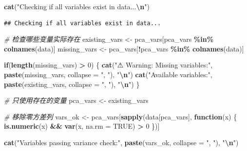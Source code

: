 \documentclass[
]{article}
\newenvironment{Shaded}{\begin{snugshade}}{\end{snugshade}}
\newcommand{\AttributeTok}[1]{\textcolor[rgb]{0.13,0.29,0.53}{#1}}
\newcommand{\CommentTok}[1]{\textcolor[rgb]{0.56,0.35,0.01}{\textit{#1}}}
\newcommand{\ConstantTok}[1]{\textcolor[rgb]{0.56,0.35,0.01}{#1}}
\newcommand{\ControlFlowTok}[1]{\textcolor[rgb]{0.13,0.29,0.53}{\textbf{#1}}}
\newcommand{\DecValTok}[1]{\textcolor[rgb]{0.00,0.00,0.81}{#1}}
\newcommand{\FunctionTok}[1]{\textcolor[rgb]{0.13,0.29,0.53}{\textbf{#1}}}
\newcommand{\NormalTok}[1]{#1}
\newcommand{\OtherTok}[1]{\textcolor[rgb]{0.56,0.35,0.01}{#1}}
\newcommand{\SpecialCharTok}[1]{\textcolor[rgb]{0.81,0.36,0.00}{\textbf{#1}}}
\newcommand{\StringTok}[1]{\textcolor[rgb]{0.31,0.60,0.02}{#1}}
\begin{document}
\begin{Shaded}
\begin{Highlighting}[]
\FunctionTok{cat}\NormalTok{(}\StringTok{"Checking if all variables exist in data...}\SpecialCharTok{\textbackslash{}n}\StringTok{"}\NormalTok{)}
\end{Highlighting}
\end{Shaded}

\begin{verbatim}
## Checking if all variables exist in data...
\end{verbatim}

\begin{Shaded}
\begin{Highlighting}[]
\CommentTok{\# 检查哪些变量实际存在}
\NormalTok{existing\_vars }\OtherTok{\textless{}{-}}\NormalTok{ pca\_vars[pca\_vars }\SpecialCharTok{\%in\%} \FunctionTok{colnames}\NormalTok{(data)]}
\NormalTok{missing\_vars }\OtherTok{\textless{}{-}}\NormalTok{ pca\_vars[}\SpecialCharTok{!}\NormalTok{pca\_vars }\SpecialCharTok{\%in\%} \FunctionTok{colnames}\NormalTok{(data)]}

\ControlFlowTok{if}\NormalTok{(}\FunctionTok{length}\NormalTok{(missing\_vars) }\SpecialCharTok{\textgreater{}} \DecValTok{0}\NormalTok{) \{}
  \FunctionTok{cat}\NormalTok{(}\StringTok{"⚠ Warning: Missing variables:"}\NormalTok{, }\FunctionTok{paste}\NormalTok{(missing\_vars, }\AttributeTok{collapse =} \StringTok{", "}\NormalTok{), }\StringTok{"}\SpecialCharTok{\textbackslash{}n}\StringTok{"}\NormalTok{)}
  \FunctionTok{cat}\NormalTok{(}\StringTok{"Available variables:"}\NormalTok{, }\FunctionTok{paste}\NormalTok{(existing\_vars, }\AttributeTok{collapse =} \StringTok{", "}\NormalTok{), }\StringTok{"}\SpecialCharTok{\textbackslash{}n}\StringTok{"}\NormalTok{)}
\NormalTok{\}}

\CommentTok{\# 只使用存在的变量}
\NormalTok{pca\_vars }\OtherTok{\textless{}{-}}\NormalTok{ existing\_vars}

\CommentTok{\# 移除零方差列}
\NormalTok{vars\_ok }\OtherTok{\textless{}{-}}\NormalTok{ pca\_vars[}\FunctionTok{sapply}\NormalTok{(data[pca\_vars], }\ControlFlowTok{function}\NormalTok{(x) \{}
  \FunctionTok{is.numeric}\NormalTok{(x) }\SpecialCharTok{\&\&} \FunctionTok{var}\NormalTok{(x, }\AttributeTok{na.rm =} \ConstantTok{TRUE}\NormalTok{) }\SpecialCharTok{\textgreater{}} \DecValTok{0}
\NormalTok{\})]}

\FunctionTok{cat}\NormalTok{(}\StringTok{"Variables passing variance check:"}\NormalTok{, }\FunctionTok{paste}\NormalTok{(vars\_ok, }\AttributeTok{collapse =} \StringTok{", "}\NormalTok{), }\StringTok{"}\SpecialCharTok{\textbackslash{}n}\StringTok{"}\NormalTok{)}
\end{Highlighting}
\end{Shaded}
\end{document}
